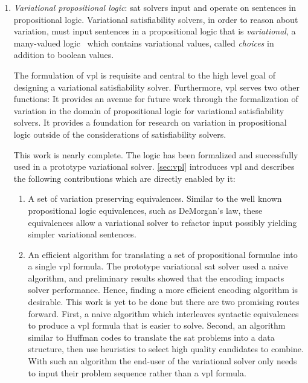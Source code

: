 \begin{enumerate}
\item\label{vpl-deliverable} \emph{Variational propositional logic}: \ac{sat}
  solvers input and operate on sentences in propositional
  logic\cite{10.5555/1324777}. Variational satisfiability solvers, in order to
  reason about variation, must input sentences in a propositional logic that is
  \textit{variational}, \ie{} a many-valued logic~\cite{Rescher1969-RESML} which
  contains variational values, called \emph{choices} in addition to boolean
  values.

  The formulation of \ac{vpl} is requisite and central to the high level goal of
  designing a variational satisfiability solver. Furthermore, \ac{vpl} serves
  two other functions: It provides an avenue for future work through the
  formalization of variation in the domain of propositional logic for
  variational satisfiability solvers. It provides a foundation for research on
  variation in propositional logic outside of the considerations of
  satisfiability solvers.

  This work is nearly complete. The logic has been formalized and successfully
  used in a prototype variational solver\cite{10.1145/3382025.3414965}.
  \autoref{sec:vpl} introduces \ac{vpl} and describes the following
  contributions which are directly enabled by it:

  \begin{enumerate}
  \item \checkmark{} A set of variation preserving equivalences. Similar to the well known
    propositional logic equivalences, such as DeMorgan's law, these equivalences
    allow a variational solver to refactor input possibly yielding simpler
    variational sentences.
  \item\label{encoding-strat-deliverable} An efficient algorithm for translating
    a set of propositional formulae into a single \ac{vpl} formula. The
    prototype variational \ac{sat} solver used a naive algorithm, and
    preliminary results showed that the encoding impacts solver performance.
    Hence, finding a more efficient encoding algorithm is desirable. This work
    is yet to be done but there are two promising routes forward. First, a naive
    algorithm which interleaves syntactic equivalences to produce a \ac{vpl}
    formula that is easier to solve. Second, an algorithm similar to Huffman
    codes\cite{4051119} to translate the \ac{sat} problems into a data
    structure, then use heuristics to select high quality candidates to combine.
    With such an algorithm the end-user of the variational solver only needs to
    input their problem sequence rather than a \ac{vpl} formula.
  \end{enumerate}


\end{enumerate}
